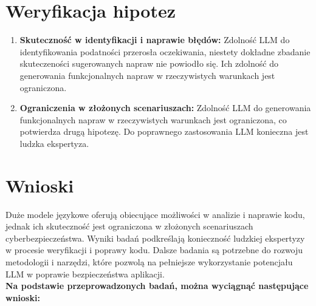 \section*{Weryfikacja hipotez}
\begin{enumerate}
    \item \textbf{Skuteczność w identyfikacji i naprawie błędów:} Zdolność LLM do identyfikowania podatności przerosła oczekiwania, niestety dokładne zbadanie skuteczeności sugerowanych napraw nie powiodło się. Ich zdolność do generowania funkcjonalnych napraw w rzeczywistych warunkach jest ograniczona.
    \item \textbf{Ograniczenia w złożonych scenariuszach:} Zdolność LLM do generowania funkcjonalnych napraw w rzeczywistych warunkach jest ograniczona, co potwierdza drugą hipotezę. Do poprawnego zastosowania LLM konieczna jest ludzka ekspertyza.
\end{enumerate}

\section*{Wnioski}
Duże modele językowe oferują obiecujące możliwości w analizie i naprawie kodu, jednak ich skuteczność jest ograniczona w złożonych scenariuszach cyberbezpieczeństwa. Wyniki badań podkreślają konieczność ludzkiej ekspertyzy w procesie weryfikacji i poprawy kodu. Dalsze badania są potrzebne do rozwoju metodologii i narzędzi, które pozwolą na pełniejsze wykorzystanie potencjału LLM w poprawie bezpieczeństwa aplikacji. 
\\
\textbf{Na podstawie przeprowadzonych badań, można wyciągnąć następujące wnioski:}

